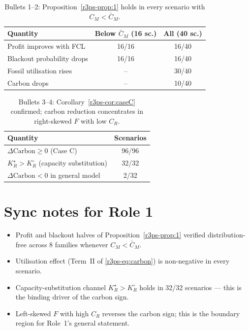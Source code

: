 \begin{table}[h]\centering
\begin{tabular}{lcc}
\toprule
Quantity & Below $\bar C_M$ (16 sc.) & All (40 sc.) \\
\midrule
Profit improves with FCL          & 16/16 & 16/40 \\
Blackout probability drops        & 16/16 & 16/40 \\
Fossil utilisation rises          & --    & 30/40 \\
Carbon drops                      & --    & 10/40 \\
\bottomrule
\end{tabular}
\caption{Bullets 1--2: Proposition~\ref{r3ps-prop:1} holds in every scenario with $C_M<\bar C_M$.}
\end{table}

\begin{table}[h]\centering
\begin{tabular}{lc}
\toprule
Quantity & Scenarios \\
\midrule
$\Delta\text{Carbon}\ge 0$ (Case C)              & 96/96 \\
$K_R^{\star}>K_R^{\circ}$ (capacity substitution) & 32/32 \\
$\Delta\text{Carbon}<0$ in general model          & 2/32 \\
\bottomrule
\end{tabular}
\caption{Bullets 3--4: Corollary~\ref{r3ps-cor:caseC} confirmed; carbon reduction concentrates in right-skewed $F$ with low $C_R$.}
\end{table}

\section{Sync notes for Role 1}
\begin{itemize}
\item Profit and blackout halves of Proposition~\ref{r3ps-prop:1} verified distribution-free across 8 families whenever $C_M<\bar C_M$.
\item Utilisation effect (Term~II of \eqref{r3ps-eq:carbon}) is non-negative in every scenario.
\item Capacity-substitution channel $K_R^{\star}>K_R^{\circ}$ holds in 32/32 scenarios --- this is the binding driver of the carbon sign.
\item Left-skewed $F$ with high $C_R$ reverses the carbon sign; this is the boundary region for Role~1's general statement.
\end{itemize}
